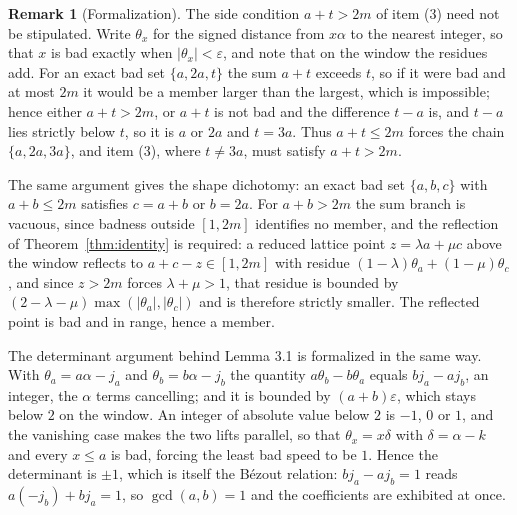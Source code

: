 \documentclass[11pt]{amsart}
\theoremstyle{plain}
\theoremstyle{definition}
\newtheorem{remark}[theorem]{Remark}
\begin{document}
\begin{remark}[Formalization]
The side condition $a+t>2m$ of item (3) need not be stipulated. Write $\theta_x$ for the signed
distance from $x\alpha$ to the nearest integer, so that $x$ is bad exactly when
$|\theta_x|<\varepsilon$, and note that on the window the residues add. For an exact bad set
$\{a,2a,t\}$ the sum $a+t$ exceeds $t$, so if it were bad and at most $2m$ it would be a member
larger than the largest, which is impossible; hence either $a+t>2m$, or $a+t$ is not bad and the
difference $t-a$ is, and $t-a$ lies strictly below $t$, so it is $a$ or $2a$ and $t=3a$. Thus
$a+t\le 2m$ forces the chain $\{a,2a,3a\}$, and item (3), where $t\neq 3a$, must satisfy $a+t>2m$.

The same argument gives the shape dichotomy: an exact bad set $\{a,b,c\}$ with $a+b\le 2m$ satisfies
$c=a+b$ or $b=2a$. For $a+b>2m$ the sum branch is vacuous, since badness outside $[1,2m]$ identifies
no member, and the reflection of Theorem~\ref{thm:identity} is required: a reduced lattice point
$z=\lambda a+\mu c$ above the window reflects to $a+c-z\in[1,2m]$ with residue
$(1-\lambda)\theta_a+(1-\mu)\theta_c$, and since $z>2m$ forces $\lambda+\mu>1$, that residue is
bounded by $(2-\lambda-\mu)\max(|\theta_a|,|\theta_c|)$ and is therefore strictly smaller. The
reflected point is bad and in range, hence a member.

The determinant argument behind Lemma 3.1 is formalized in the same way. With
$\theta_a=a\alpha-j_a$ and $\theta_b=b\alpha-j_b$ the quantity $a\theta_b-b\theta_a$ equals
$b j_a-a j_b$, an integer, the $\alpha$ terms cancelling; and it is bounded by $(a+b)\varepsilon$,
which stays below $2$ on the window. An integer of absolute value below $2$ is $-1$, $0$ or $1$, and
the vanishing case makes the two lifts parallel, so that $\theta_x=x\delta$ with $\delta=\alpha-k$
and every $x\le a$ is bad, forcing the least bad speed to be $1$. Hence the determinant is $\pm1$,
which is itself the B\'ezout relation: $b j_a-a j_b=1$ reads $a(-j_b)+b j_a=1$, so $\gcd(a,b)=1$ and
the coefficients are exhibited at once.


\end{remark}
\end{document}
